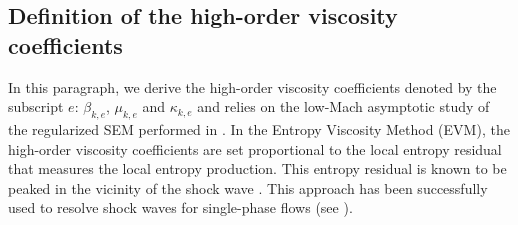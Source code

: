 \documentclass[preprint,10pt]{elsarticle}
\begin{document}
\subsection{Definition of the high-order viscosity coefficients}\label{sec:visc-coeff-ho}
%
In this paragraph, we derive the high-order viscosity coefficients denoted by the subscript $e$: $\beta_{k,e}$, $\mu_{k,e}$ and $\kappa_{k,e}$ and relies on the low-Mach asymptotic study of the regularized SEM 
performed in \cite{Marco_paper_sem}. In the Entropy Viscosity Method (EVM), the high-order viscosity coefficients are set proportional to the local entropy 
residual that measures the local entropy production. This entropy residual is known to be peaked in the vicinity of the shock wave \cite{Leveque}. 
This approach has been successfully used to resolve shock waves for single-phase flows (see \cite{GuermondJCP2011, GuermondCSE2011, GuermondCRA2008,ZinganJCP2013,DelchiniCompFluid2014-euler}). 
\end{document}
